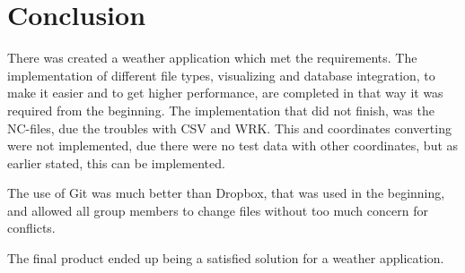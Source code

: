 \chapter{Conclusion}
There was created a weather application which met the requirements.
The implementation of different file types, visualizing and database integration, to make it easier and to get higher performance, are completed in that way it was required from the beginning. 
The implementation that did not finish, was the NC-files, due the troubles with CSV and WRK. This and coordinates converting were not implemented, due there were no test data with other coordinates, but as earlier stated, this can be implemented.

The use of Git was much better than Dropbox, that was used in the beginning, and allowed all group members to change files without too much concern for conflicts. 

The final product ended up being a satisfied solution for a weather application.